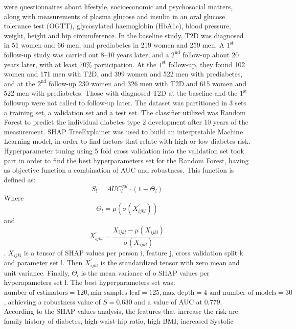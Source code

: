 \documentclass[journal,article,submit,pdftex,moreauthors]{Definitions/mdpi}
\begin{document}
were questionnaires about lifestyle, socioeconomic and psychosocial matters, along
with measurements of plasma glucose and insulin in an oral glucose
tolerance test (OGTT), glycosylated haemoglobin (HbA1c), blood pressure,
weight, height and hip circumference. In the baseline study, T2D
was diagnosed in 51 women and 66 men, and prediabetes in 219 women
and 259 men. A $1^{\textrm{st}}$ follow-up study was carried out 8–10 years later,
and a $2^{\textrm{nd}}$ follow-up about 20 years later, with at least 70\% participation.
At the $1^{\textrm{st}}$ follow-up, they found 102 women and 171 men with T2D, and
399 women and 522 men with prediabetes, and at the $2^{\textrm{nd}}$ follow-up 230
women and 326 men with T2D and 615 women and 522 men with
prediabetes. Those with diagnosed T2D at the baseline and the $1^{\textrm{st}}$ followup
were not called to follow-up later. The dataset was partitioned
in 3 sets a training set, a validation set and a test set. The classifier utilized was Random 
Forest to predict the individual diabetes type 2 development after 10 years of the measurement.
SHAP TreeExplainer was used to build an interpretable Machine Learning model, in order to find 
factors that relate with high or low diabetes risk. Hyperparameter tuning using 5 fold cross 
validation into the validation set took part in order to find the best hyperparameters set for 
the Random Forest, having as objective function a combination of AUC and robustness. This
function is defined as: 
\begin{equation}
	S_l=AUC_{l}^{val}\cdot(1-\Theta_{l})
\end{equation}
Where
\begin{equation}
	\Theta_{l}=\mu(\sigma(X_{ijkl}^{'}))
\end{equation} 
and 
\begin{equation}
	X_{ijkl}^{'}=\frac{X_{ijkl}-\mu(X_{ijkl})}{\sigma(X_{ijkl})}
\end{equation}.
$X_{ijkl}$ is a tensor of SHAP values per person i, feature j, cross
validation split k and parameter set l. Then $X_{ijkl}^{'}$ is the standardized
tensor with zero mean and unit variance. Finally, $\Theta_{l}$ is the mean
variance of o SHAP values per hyperapameters set l. The best hyperparameters
set was: $\textrm{number of estimators} = 120, \textrm{min samples leaf}=125, \textrm{max depth}=4 \textrm{ and
number of models} = 30 $, achieving a robustness value of $ S=0.630 $ and
a value of AUC at $0.779$. According to the SHAP values analysis, the features that increase
the risk are: family history of diabetes, high waist-hip  ratio, high BMI, increased Systolic
\end{document}
